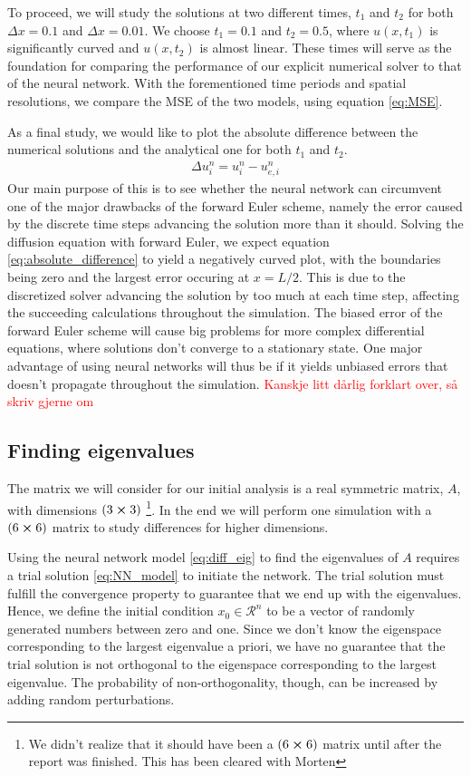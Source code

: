 \documentclass[12pt]{extarticle}
\begin{document}
To proceed, we will study the solutions at two different times, $t_1$ and $t_2$ for both $\Delta x = 0.1$ and $\Delta x = 0.01$. We choose $t_1=0.1$ and $t_2=0.5$, where $u(x,t_1)$ is significantly curved and $u(x,t_2)$ is almost linear. These times will serve as the foundation for comparing the performance of our explicit numerical solver to that of the neural network. With the forementioned time periods and spatial resolutions, we compare the MSE of the two models, using equation \eqref{eq:MSE}. 

As a final study, we would like to plot the absolute difference between the numerical solutions and the analytical one for both $t_1$ and $t_2$. 
\begin{align} \label{eq:absolute_difference}
	\Delta u_i^n = u_i^n - u_{e,i}^n
\end{align}
Our main purpose of this is to see whether the neural network can circumvent one of the major drawbacks of the forward Euler scheme, namely the error caused by the discrete time steps advancing the solution more than it should. Solving the diffusion equation with forward Euler, we expect equation \eqref{eq:absolute_difference} to yield a negatively curved plot, with the boundaries being zero and the largest error occuring at $x=L/2$. This is due to the discretized solver advancing the solution by too much at each time step, affecting the succeeding calculations throughout the simulation. The biased error of the forward Euler scheme will cause big problems for more complex differential equations, where solutions don't converge to a stationary state. One major advantage of using neural networks will thus be if it yields unbiased errors that doesn't propagate throughout the simulation. \textcolor{red}{Kanskje litt dårlig forklart over, så skriv gjerne om}



\subsection{Finding eigenvalues}
The matrix we will consider for our initial analysis is a real symmetric matrix, $A$, with dimensions $(3\cross3)$ \footnote{We didn't realize that it should have been a $(6\cross6)$ matrix until after the report was finished. This has been cleared with Morten}. In the end we will perform one simulation with a $(6\cross6)$ matrix to study differences for higher dimensions. 

Using the neural network model \eqref{eq:diff_eig} to find the eigenvalues of $A$ requires a trial solution \eqref{eq:NN_model} to initiate the network. The trial solution must fulfill the convergence property to guarantee that we end up with the eigenvalues. Hence, we define the initial condition $x_0 \in \mathcal{R}^n$ to be a vector of randomly generated numbers between zero and one. Since we don't know the eigenspace corresponding to the largest eigenvalue a priori, we have no guarantee that the trial solution is not orthogonal to the eigenspace corresponding to the largest eigenvalue. The probability of non-orthogonality, though, can be increased by adding random perturbations.
\end{document}
